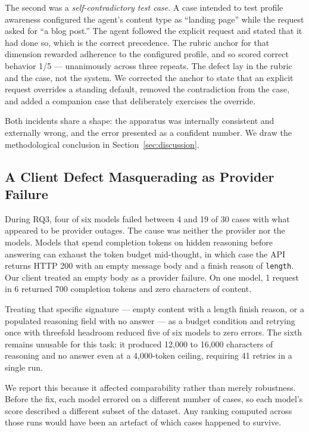 \documentclass[journal]{IEEEtran}
\begin{document}
The second was a \emph{self-contradictory test case}. A case intended to test
profile awareness configured the agent's content type as ``landing page'' while
the request asked for ``a blog post.'' The agent followed the explicit request
and stated that it had done so, which is the correct precedence. The rubric
anchor for that dimension rewarded adherence to the configured profile, and so
scored correct behavior 1/5 --- unanimously across three repeats. The defect
lay in the rubric and the case, not the system. We corrected the anchor to state
that an explicit request overrides a standing default, removed the
contradiction from the case, and added a companion case that deliberately
exercises the override.

Both incidents share a shape: the apparatus was internally consistent and
externally wrong, and the error presented as a confident number. We draw the
methodological conclusion in Section~\ref{sec:discussion}.

\subsection{A Client Defect Masquerading as Provider Failure}
\label{sec:reasoning}

During RQ3, four of six models failed between 4 and 19 of 30 cases with what
appeared to be provider outages. The cause was neither the provider nor the
models. Models that spend completion tokens on hidden reasoning before
answering can exhaust the token budget mid-thought, in which case the API
returns HTTP 200 with an empty message body and a finish reason of
\texttt{length}. Our client treated an empty body as a provider failure. On one
model, 1 request in 6 returned 700 completion tokens and zero characters of
content.

Treating that specific signature --- empty content with a length finish reason,
or a populated reasoning field with no answer --- as a budget condition and
retrying once with threefold headroom reduced five of six models to zero
errors. The sixth remains unusable for this task: it produced 12{,}000 to
16{,}000 characters of reasoning and no answer even at a 4{,}000-token ceiling,
requiring 41 retries in a single run.

We report this because it affected comparability rather than merely robustness.
Before the fix, each model errored on a different number of cases, so each
model's score described a different subset of the dataset. Any ranking computed
across those runs would have been an artefact of which cases happened to
survive.
\end{document}

